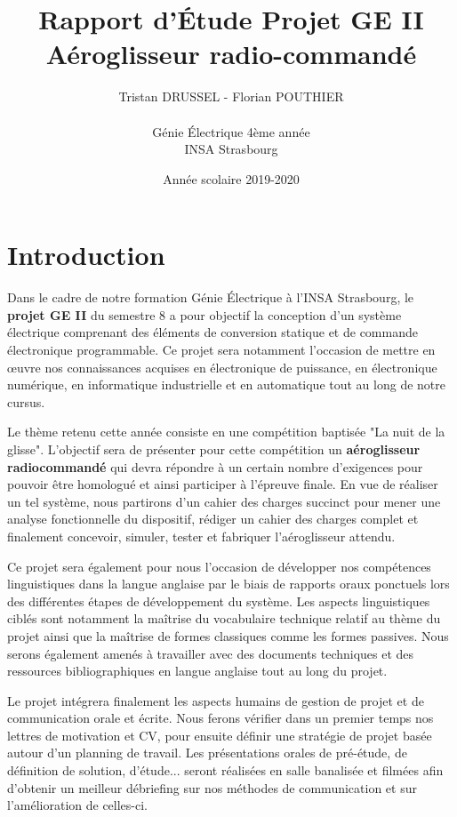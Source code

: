 \documentclass[a4paper,12pt]{book}
\title{Rapport d'Étude Projet GE II\\Aéroglisseur radio-commandé}
\author{Tristan DRUSSEL - Florian POUTHIER \\ \\ Génie Électrique 4ème année\\ INSA Strasbourg}
\date{Année scolaire 2019-2020}
\begin{document}
\begin{titlepage}		
	\maketitle
\end{titlepage}
	\tableofcontents
	
\chapter{Introduction}
	
	Dans le cadre de notre formation Génie Électrique à l'INSA Strasbourg, le \textbf{projet GE II} du semestre 8 a pour objectif la conception d'un système électrique comprenant des éléments de conversion statique et de commande électronique programmable. Ce projet sera notamment l'occasion de mettre en œuvre nos connaissances acquises en électronique de puissance, en électronique numérique, en informatique industrielle et en automatique tout au long de notre cursus. 
	
	Le thème retenu cette année consiste en une compétition baptisée "La nuit de la glisse". L'objectif sera de présenter pour cette compétition un \textbf{aéroglisseur radiocommandé} qui devra répondre à un certain nombre d'exigences pour pouvoir être homologué et ainsi participer à l'épreuve finale. En vue de réaliser un tel système, nous partirons d'un cahier des charges succinct pour mener une analyse fonctionnelle du dispositif, rédiger un cahier des charges complet et finalement concevoir, simuler, tester et fabriquer l'aéroglisseur attendu.
	
	Ce projet sera également pour nous l'occasion de développer nos compétences linguistiques dans la langue anglaise par le biais de rapports oraux ponctuels lors des différentes étapes de développement du système. Les aspects linguistiques ciblés sont notamment la maîtrise du vocabulaire technique relatif au thème du projet ainsi que la maîtrise de formes classiques comme les formes passives. Nous serons également amenés à travailler avec des documents techniques et des ressources bibliographiques en langue anglaise tout au long du projet.
	
	Le projet intégrera finalement les aspects humains de gestion de projet et de communication orale et écrite. Nous ferons vérifier dans un premier temps nos lettres de motivation et CV, pour ensuite définir une stratégie de projet basée autour d'un planning de travail. Les présentations orales de pré-étude, de définition de solution, d'étude... seront réalisées en salle banalisée et filmées afin d'obtenir un meilleur débriefing sur nos méthodes de communication et sur l'amélioration de celles-ci.
	
\end{document}
